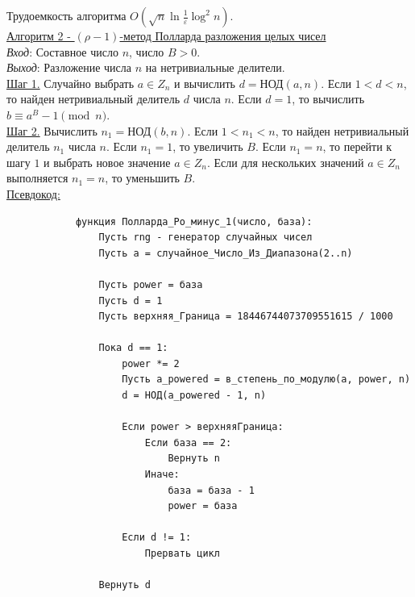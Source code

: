 \documentclass[bachelor, och, labwork]{shiza}
\begin{document}
            Трудоемкость алгоритма $O(\sqrt{n}\ln \frac{1}{\varepsilon} \log^2 n)$.\\

        \underline{Алгоритм 2 - $(\rho - 1)$-метод Полларда разложения целых чисел}\\
            \textit{Вход}: Составное число $n$, число $B > 0$.\\
            \textit{Выход}: Разложение числа $n$ на нетривиальные делители.\\
            \underline{Шаг 1.} Случайно выбрать $a \in Z_n$ и вычислить $d =
            \text{НОД}(a, n)$. Если $1 < d < n$, то найден нетривиальный
            делитель $d$ числа $n$. Если $d = 1$, то вычислить $b \equiv a^B - 1 \pmod n$.\\
            \underline{Шаг 2.} Вычислить $n_1 = \text{НОД}(b, n)$. Если $1 < n_1
            < n$, то найден нетривиальный делитель $n_1$ числа $n$. Если $n_1 =
            1$, то увеличить $B$. Если $n_1 = n$, то перейти к шагу $1$ и
            выбрать новое значение $a \in Z_n$. Если для нескольких значений $a
            \in Z_n$ выполняется $n_1 = n$, то уменьшить $B$.\\
            
        \underline{Псевдокод:}
            \begin{verbatim}
            функция Полларда_Ро_минус_1(число, база):
                Пусть rng - генератор случайных чисел
                Пусть a = случайное_Число_Из_Диапазона(2..n)
                
                Пусть power = база
                Пусть d = 1
                Пусть верхняя_Граница = 18446744073709551615 / 1000
            
                Пока d == 1:
                    power *= 2
                    Пусть a_powered = в_степень_по_модулю(a, power, n)
                    d = НОД(a_powered - 1, n)
                    
                    Если power > верхняяГраница:
                        Если база == 2:
                            Вернуть n
                        Иначе:
                            база = база - 1
                            power = база
            
                    Если d != 1:
                        Прервать цикл
                
                Вернуть d
                         
            \end{verbatim}
\end{document}
